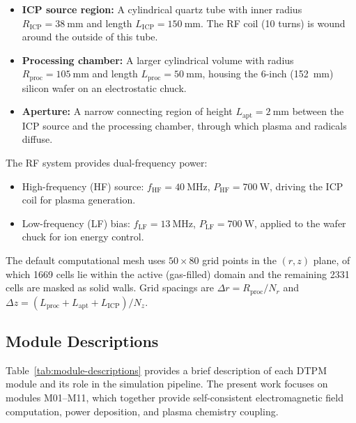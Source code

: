 \documentclass[11pt,a4paper]{report}
\newcommand{\dr}{\Delta r}
\newcommand{\dz}{\Delta z}
\begin{document}
\begin{itemize}
  \item \textbf{ICP source region:} A cylindrical quartz tube with inner radius $R_\mathrm{ICP} = \SI{38}{\milli\meter}$ and length $L_\mathrm{ICP} = \SI{150}{\milli\meter}$.  The RF coil (10 turns) is wound around the outside of this tube.
  \item \textbf{Processing chamber:} A larger cylindrical volume with radius $R_\mathrm{proc} = \SI{105}{\milli\meter}$ and length $L_\mathrm{proc} = \SI{50}{\milli\meter}$, housing the 6-inch (\SI{152}{\milli\meter}) silicon wafer on an electrostatic chuck.
  \item \textbf{Aperture:} A narrow connecting region of height $L_\mathrm{apt} = \SI{2}{\milli\meter}$ between the ICP source and the processing chamber, through which plasma and radicals diffuse.
\end{itemize}

The RF system provides dual-frequency power:
\begin{itemize}
  \item High-frequency (HF) source: $f_\mathrm{HF} = \SI{40}{\mega\hertz}$, $P_\mathrm{HF} = \SI{700}{\watt}$, driving the ICP coil for plasma generation.
  \item Low-frequency (LF) bias: $f_\mathrm{LF} = \SI{13}{\mega\hertz}$, $P_\mathrm{LF} = \SI{700}{\watt}$, applied to the wafer chuck for ion energy control.
\end{itemize}

The default computational mesh uses $50 \times 80$ grid points in the $(r, z)$ plane, of which 1669 cells lie within the active (gas-filled) domain and the remaining 2331 cells are masked as solid walls.  Grid spacings are $\dr = R_\mathrm{proc}/N_r$ and $\dz = (L_\mathrm{proc} + L_\mathrm{apt} + L_\mathrm{ICP})/N_z$.

\subsection{Module Descriptions}

Table~\ref{tab:module-descriptions} provides a brief description of each DTPM module and its role in the simulation pipeline.  The present work focuses on modules M01--M11, which together provide self-consistent electromagnetic field computation, power deposition, and plasma chemistry coupling.
\end{document}
